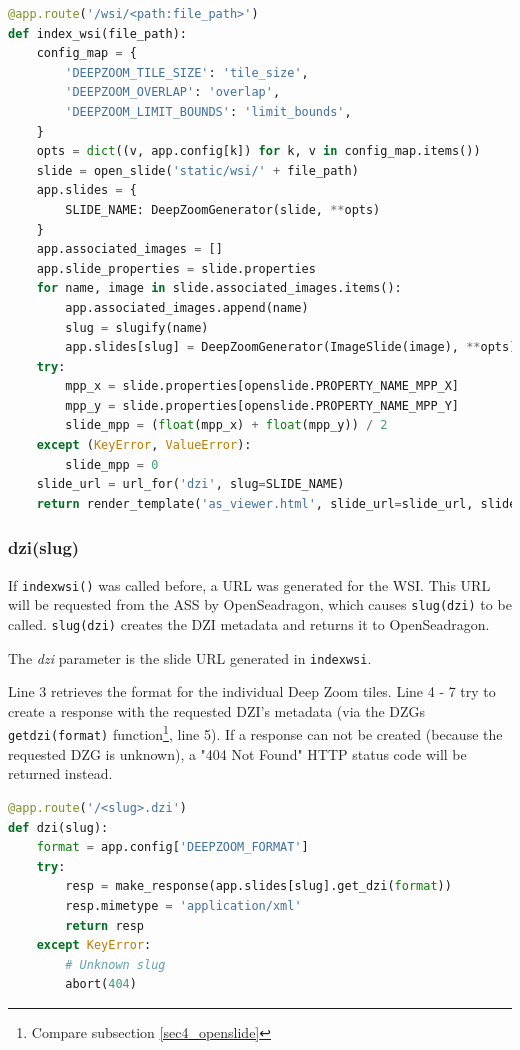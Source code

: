 \begin{lstlisting}[language=Python, frame=single]
@app.route('/wsi/<path:file_path>')
def index_wsi(file_path):
	config_map = {
		'DEEPZOOM_TILE_SIZE': 'tile_size',
		'DEEPZOOM_OVERLAP': 'overlap',
		'DEEPZOOM_LIMIT_BOUNDS': 'limit_bounds',
	}
	opts = dict((v, app.config[k]) for k, v in config_map.items())
	slide = open_slide('static/wsi/' + file_path)
	app.slides = {
		SLIDE_NAME: DeepZoomGenerator(slide, **opts)
	}
	app.associated_images = []
	app.slide_properties = slide.properties
	for name, image in slide.associated_images.items():
		app.associated_images.append(name)
		slug = slugify(name)
		app.slides[slug] = DeepZoomGenerator(ImageSlide(image), **opts)
	try:
		mpp_x = slide.properties[openslide.PROPERTY_NAME_MPP_X]
		mpp_y = slide.properties[openslide.PROPERTY_NAME_MPP_Y]
		slide_mpp = (float(mpp_x) + float(mpp_y)) / 2
	except (KeyError, ValueError):
		slide_mpp = 0
	slide_url = url_for('dzi', slug=SLIDE_NAME)
	return render_template('as_viewer.html', slide_url=slide_url, slide_mpp=slide_mpp, file_name=file_path, dictionary=getDictionary(file_name))
\end{lstlisting}


\subsubsection{dzi(slug)}
If \texttt{index{\textunderscore}wsi()} was called before, a URL was generated for the WSI. This URL will be requested from the ASS by OpenSeadragon, which causes \texttt{slug(dzi)} to be called. \texttt{slug(dzi)} creates the DZI metadata and returns it to OpenSeadragon.

The \emph{dzi} parameter is the slide URL generated in \texttt{index{\textunderscore}wsi}.

Line 3 retrieves the format for the individual Deep Zoom tiles. Line 4 - 7 try to create a response with the requested DZI's metadata (via the DZGs \texttt{get{\textunderscore}dzi(format)} function\footnote{
	Compare subsection \ref{sec4_openslide}
}, line 5). If a response can not be created (because the requested DZG is unknown), a "404 Not Found" HTTP status code will be returned instead.\clearpage

\begin{lstlisting}[language=Python, frame=single]
@app.route('/<slug>.dzi')
def dzi(slug):
	format = app.config['DEEPZOOM_FORMAT']
	try:
		resp = make_response(app.slides[slug].get_dzi(format))
		resp.mimetype = 'application/xml'
		return resp
	except KeyError:
		# Unknown slug
		abort(404)
\end{lstlisting}


